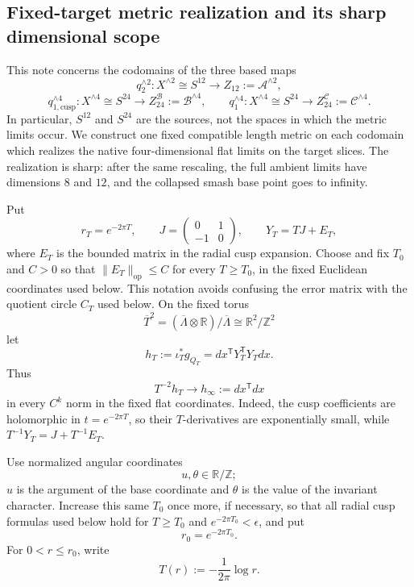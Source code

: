 \subsection{Fixed-target metric realization and its sharp dimensional scope}
\label{sphere-metric-limit-note}

This note concerns the codomains of the three based maps
\[
 q_2^{\wedge 2}:X^{\wedge 2}\cong S^{12}
   \longrightarrow Z_{12}:=\mathcal A^{\wedge 2},
\]
\[
 q_{1,\mathrm{cusp}}^{\wedge 4}:X^{\wedge 4}\cong S^{24}
   \longrightarrow Z_{24}^{\mathcal B}:=\mathcal B^{\wedge 4},
 \qquad
 q_1^{\wedge 4}:X^{\wedge 4}\cong S^{24}
   \longrightarrow Z_{24}^{\mathcal C}:=\mathcal C^{\wedge 4}.
\]
In particular, \(S^{12}\) and \(S^{24}\) are the sources, not the spaces
in which the metric limits occur.  We construct one fixed compatible
length metric on each codomain which realizes the native
four-dimensional flat limits on the target slices.  The realization is
sharp: after the same rescaling, the full ambient limits have dimensions
\(8\) and \(12\), and the collapsed smash base point goes to infinity.

Put
\[
 r_T=e^{-2\pi T},\qquad
 J=\begin{pmatrix}0&1\\-1&0\end{pmatrix},\qquad
 Y_T=TJ+E_T,
\]
where \(E_T\) is the bounded matrix in the radial cusp expansion.  Choose
and fix \(T_0\) and \(C>0\) so that
\(\|E_T\|_{\mathrm{op}}\leq C\) for every \(T\geq T_0\), in the fixed
Euclidean coordinates used below.  This notation avoids confusing the
error matrix with the quotient circle \(C_T\) used below.  On the
fixed torus
\[
 \overline T^2=(\overline\Lambda\otimes\mathbb R)/\overline\Lambda
              \cong\mathbb R^2/\mathbb Z^2
\]
let
\[
 h_T:=\iota_T^*g_{Q_T}=dx^{\mathsf T}Y_T^{\mathsf T}Y_Tdx.
\]
Thus
\begin{equation}
 T^{-2}h_T\longrightarrow h_\infty:=dx^{\mathsf T}dx
 \label{sphere-metric-normalized-Q-limit}
\end{equation}
in every \(C^k\) norm in the fixed flat coordinates.  Indeed, the cusp
coefficients are holomorphic in \(t=e^{-2\pi T}\), so their \(T\)-derivatives
are exponentially small, while \(T^{-1}Y_T=J+T^{-1}E_T\).

Use normalized angular coordinates
\[
 u,\theta\in\mathbb R/\mathbb Z;
\]
\(u\) is the argument of the base coordinate and \(\theta\) is the value of
the invariant character.  Increase this same \(T_0\) once more, if
necessary, so that all radial cusp formulas used below hold for
\(T\geq T_0\) and \(e^{-2\pi T_0}<\epsilon\), and put
\[
 r_0=e^{-2\pi T_0}.
\]
For \(0<r\leq r_0\), write
\[
 T(r):=-\frac{1}{2\pi}\log r.
\]

